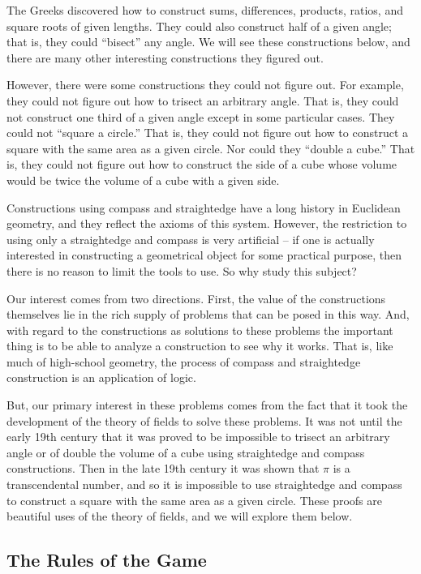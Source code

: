 \documentclass[11pt]{article}
\theoremstyle{definition}
\begin{document}
The Greeks discovered how to construct sums, differences, products, ratios, and square roots of given lengths. They could also construct half of a 
given angle; that is, they could ``bisect'' any angle. We will see these constructions below, and there are many other interesting constructions
they figured out.

However, there were some constructions they could not figure out. For example, they could not figure out how to trisect an arbitrary angle. That is, they could
not construct one third of a given angle except in some particular cases. They could not ``square a circle.'' That is, they could not figure out how to 
construct a square with the same area as a given circle.  Nor could they ``double a cube.'' That is, they could not figure out how to construct the 
side of a cube whose volume would be twice the volume of a cube with a given side.

Constructions using compass and straightedge have a long history in Euclidean geometry, and they reflect the axioms of this system. However,
the restriction to using only a straightedge and compass is very artificial -- if one is actually interested in constructing a geometrical object 
for some practical purpose, then there is no reason to limit the tools to use. So why study this subject? 

Our interest comes from two directions. First, the value of the constructions themselves lie in the rich supply of problems that can be 
posed in this way. And, with regard to the constructions as solutions to these problems the important thing is to be able to analyze a 
construction to see why it works.  That is, like much of high-school geometry, the process of compass and straightedge construction is an
application of logic.

But, our primary interest in these problems comes from the fact that it took the development of the theory of fields to solve these problems. It was not until
the early 19th century that it was proved to be impossible to trisect an arbitrary angle or of double the volume of a cube using straightedge and compass 
constructions. Then in the late 19th century it was shown that $\pi$ is a transcendental number, and so it is impossible to use straightedge and compass 
to construct a square with the same area as a given circle. These proofs are beautiful uses of the theory of fields, and we will
explore them below.

\subsection{The Rules of the Game}
\end{document}
